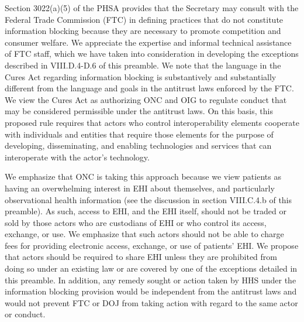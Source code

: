 \documentclass[twoside,11pt]{article}
\begin{document}






          Section 3022(a)(5) of the PHSA provides that the Secretary may consult with the Federal Trade Commission (FTC) in defining practices that do not constitute information blocking because they are necessary to promote competition and consumer welfare. We appreciate the expertise and informal technical assistance of FTC staff, which we have taken into consideration in developing the exceptions described in VIII.D.4-D.6 of this preamble. We note that the language in the Cures Act regarding information blocking is substantively and substantially different from the language and goals in the antitrust laws enforced by the FTC. We view the Cures Act as authorizing ONC and OIG to regulate conduct that may be considered permissible under the antitrust laws. On this basis, this proposed rule requires that actors who control interoperability elements cooperate with individuals and entities that require those elements for the purpose of developing, disseminating, and enabling technologies and services that can interoperate with the actor's technology.


          We emphasize that ONC is taking this approach because we view patients as having an overwhelming interest in EHI about themselves, and particularly observational health information (see the discussion in section VIII.C.4.b of this preamble). As such, access to EHI, and the EHI itself, should not be traded or sold by those actors who are custodians of EHI or who control its access, exchange, or use. We emphasize that such actors should not be able to charge fees for providing electronic access, exchange, or use of patients' EHI. We propose that actors should be required to share EHI unless they are prohibited from doing so under an existing law or are covered by one of the exceptions detailed in this preamble. In addition, any remedy sought or action taken by HHS under the information blocking provision would be independent from the antitrust laws and would not prevent FTC or DOJ from taking action with regard to the same actor or conduct.
\end{document}
